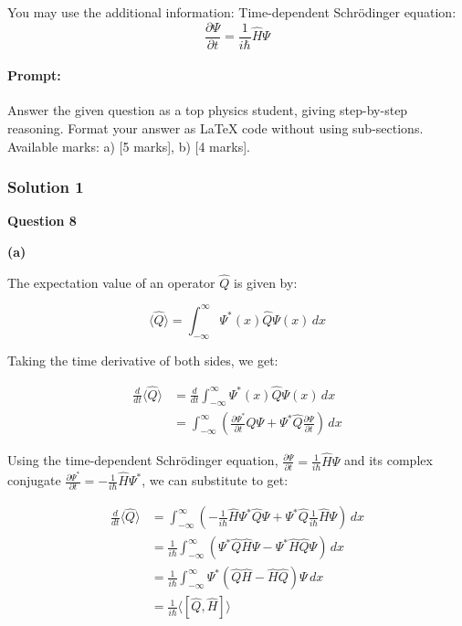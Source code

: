 \documentclass{article}
\begin{document}
You may use the additional information:  
Time-dependent Schrödinger equation:  
\[
\frac{\partial \Psi}{\partial t} = \frac{1}{i\hbar} \hat{H} \Psi
\]


\paragraph{Prompt: \\} 
Answer the given question as a top physics student, giving step-by-step reasoning. Format your answer as LaTeX code without using sub-sections. Available marks: a) [5 marks], b) [4 marks].


\subsubsection{Solution 1}
\textbf{Question 8}

\textbf{(a)} 

The expectation value of an operator $\hat{Q}$ is given by:

\begin{equation*}
\langle \hat{Q} \rangle = \int_{-\infty}^{\infty} \Psi^*(x) \hat{Q} \Psi(x) \, dx
\end{equation*}

Taking the time derivative of both sides, we get:

\begin{align*}
\frac{d}{dt} \langle \hat{Q} \rangle &= \frac{d}{dt} \int_{-\infty}^{\infty} \Psi^*(x) \hat{Q} \Psi(x) \, dx \\
&= \int_{-\infty}^{\infty} \left( \frac{\partial \Psi^*}{\partial t} \hat{Q} \Psi + \Psi^* \hat{Q} \frac{\partial \Psi}{\partial t} \right) \, dx 
\end{align*}

Using the time-dependent Schrödinger equation, $\frac{\partial \Psi}{\partial t} = \frac{1}{i\hbar} \hat{H} \Psi$ and its complex conjugate $\frac{\partial \Psi^*}{\partial t} = -\frac{1}{i\hbar} \hat{H} \Psi^*$, we can substitute to get:

\begin{align*}
\frac{d}{dt} \langle \hat{Q} \rangle &= \int_{-\infty}^{\infty} \left( -\frac{1}{i\hbar} \hat{H} \Psi^* \hat{Q} \Psi + \Psi^* \hat{Q} \frac{1}{i\hbar} \hat{H} \Psi \right) \, dx \\
&= \frac{1}{i\hbar} \int_{-\infty}^{\infty} \left( \Psi^* \hat{Q} \hat{H} \Psi - \Psi^* \hat{H} \hat{Q} \Psi \right) \, dx \\
&= \frac{1}{i\hbar} \int_{-\infty}^{\infty} \Psi^* \left( \hat{Q} \hat{H} - \hat{H} \hat{Q} \right) \Psi \, dx \\
&= \frac{1}{i\hbar} \langle [\hat{Q}, \hat{H}] \rangle
\end{align*}
\end{document}
